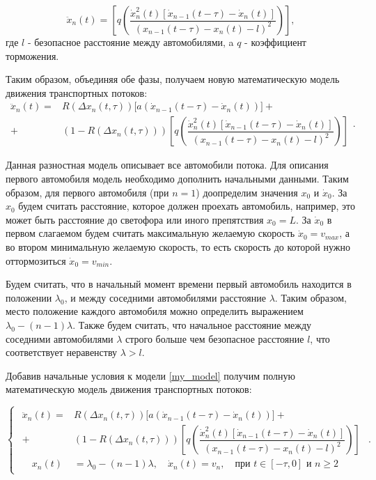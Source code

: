 \documentclass[12pt, a4paper]{extarticle}
\numberwithin{equation}{section}
\numberwithin{figure}{section}
\begin{document}
\begin{equation*}
\ddot{x}_n(t)= \left[  q\left(  \dfrac{\dot{x}_n^2(t)\left[  \dot{x}_{n-1}(t-\tau) - \dot{x}_n(t) \right]}{(x_{n-1}(t-\tau)-x_n(t)-l)^2}\right) \right],
\end{equation*}
где $l$ - безопасное расстояние между автомобилями, a $q$ - коэффициент торможения.

Таким образом, объединяя обе фазы, получаем новую математическую модель движения транспортных потоков:
\begin{equation} \label{my_model} 
\begin{split}
\ddot{x}_n(t)= &R(\Delta x_n(t,\tau))\bigg[ a(\dot{x}_{n-1}(t-\tau)-\dot{x}_n(t))\bigg]  +\\+& (1-R(\Delta x_n(t,\tau)))\left[  q\left(  \dfrac{\dot{x}_n^2(t)\left[  \dot{x}_{n-1}(t-\tau) - \dot{x}_n(t) \right]}{(x_{n-1}(t-\tau)-x_n(t)-l)^2}\right) \right] 
\end{split}.
\end{equation}

Данная разностная модель описывает все автомобили потока. Для описания первого автомобиля модель необходимо дополнить начальными данными. Таким образом, для первого автомобиля (при $n=1$) доопределим значения $x_{0}$ и $\dot{x}_{0}$. За $x_{0}$ будем считать расстояние, которое должен проехать автомобиль, например, это может быть расстояние до светофора или иного препятствия $x_{0}=L$. За $\dot{x}_{0}$ в первом слагаемом будем считать максимальную желаемую скорость $\dot{x}_{0}=v_{max}$, а во втором минимальную желаемую скорость, то есть скорость до которой нужно оттормозиться $\dot{x}_{0}=v_{min}$.

Будем считать, что в начальный момент времени первый автомобиль находится в положении $\lambda_0$, и между соседними автомобилями расстояние $\lambda$. Таким образом, место положение каждого автомобиля можно определить выражением $\lambda_0-(n-1)\lambda$. Также будем считать, что начальное расстояние между соседними автомобилями $\lambda$ строго больше чем безопасное расстояние $l$, что соответствует неравенству $\lambda > l$.

Добавив начальные условия к модели \eqref{my_model} получим полную математическую модель движения транспортных потоков:

\begin{equation} \label{new_model} 
\begin{cases}
\begin{split}
\ddot{x}_n(t)= &R(\Delta x_n(t,\tau))\bigg[ a(\dot{x}_{n-1}(t-\tau)-\dot{x}_n(t))\bigg]  +\\+& (1-R(\Delta x_n(t,\tau)))\left[  q\left(  \dfrac{\dot{x}_n^2(t)\left[  \dot{x}_{n-1}(t-\tau) - \dot{x}_n(t) \right]}{(x_{n-1}(t-\tau)-x_n(t)-l)^2}\right) \right] \\
 \quad x_n(t)&=\lambda_0-(n-1)\lambda, \quad \dot{x}_n(t)=v_{n}, \quad \text{при } t \in [-\tau,0] \text{ и } n\geq2
\end{split}
\end{cases}.
\end{equation}
\end{document}
